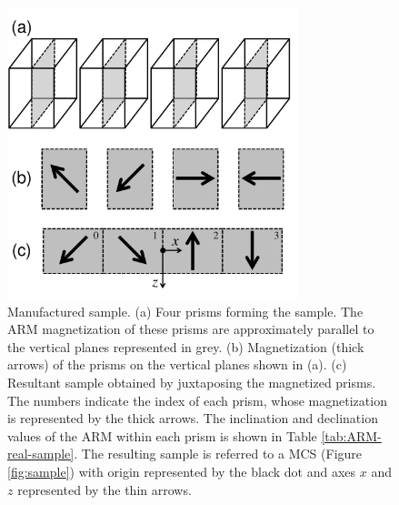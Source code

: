 \documentclass[draft,gc]{agutex}
\begin{document}
 \begin{figure}
 \noindent \includegraphics[width=20pc]{Figs/Fig13_HQ.pdf}
 \caption{Manufactured sample. 
 (a) Four prisms forming the sample. The ARM magnetization of these
 prisms are approximately parallel to the vertical planes represented
 in grey.
 (b) Magnetization (thick arrows) of the prisms on the vertical 
 planes shown in (a).
 (c) Resultant sample obtained by juxtaposing the magnetized prisms.
 The numbers indicate the index of each prism, whose magnetization
 is represented by the thick arrows. The inclination and declination
 values of the ARM within each prism is shown in Table 
 \ref{tab:ARM-real-sample}.
 The resulting sample is referred to a MCS (Figure \ref{fig:sample}) 
 with origin represented by the black dot and axes $x$ and $z$ 
 represented by the thin arrows.}
 \label{fig:real-sample}
 \end{figure}
\end{document}
